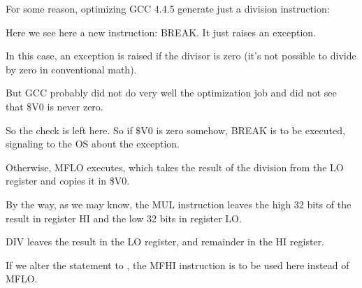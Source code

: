 ﻿

For some reason, optimizing GCC 4.4.5 generate just a division instruction:



Here we see here a new instruction: BREAK. It just raises an exception.

In this case, an exception is raised if the divisor is zero (it's not possible to divide by zero 
in conventional math).

But GCC probably did not do very well the optimization job and did not see that \$V0 is never zero.

So the check is left here.
So if \$V0 is zero somehow, BREAK is to be executed, signaling to the \ac{OS} about the exception.

Otherwise, MFLO executes, which takes the result of the division from the LO register and copies it in \$V0.

By the way, as we may know, the MUL instruction leaves the high 32 bits of 
the result in register HI and the low 32 bits in register LO.

DIV leaves the result in the LO register, and remainder in the HI register.

If we alter the statement to , 
the MFHI instruction is to be used here instead of MFLO.

